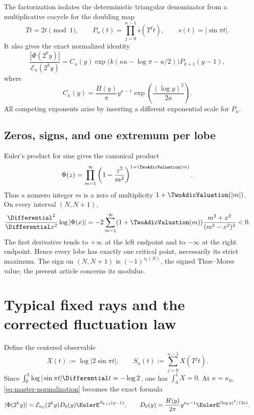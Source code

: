 \documentclass[11pt]{article}
\theoremstyle{definition}
\theoremstyle{remark}
\newcommand{\T}{T}
\newcommand{\Ecal}{\mathcal E}
\begin{document}
The factorization isolates the deterministic triangular denominator from a
multiplicative cocycle for the doubling map
\begin{equation}
 \T t=2t\pmod1,
 \qquad
 P_n(t)=\prod_{j=0}^{n-1}s(\T^jt),
 \qquad s(t)=|\sin\pi t|.
 \label{eq:doubling}
\end{equation}
It also gives the exact normalized identity
\begin{equation}
 \frac{|\Phi(2^ky)|}{\Ecal_\kappa(2^ky)}
 =C_\kappa(y)
 \exp\!\bigl(k(\kappa a-\log\pi-a/2)\bigr)P_{k+1}(y-1),
 \label{eq:master-normalization}
\end{equation}
where
\begin{equation}
 C_\kappa(y)=\frac{H(y)}{\pi}
 y^{\kappa-1}\exp\!\left(\frac{(\log y)^2}{2a}\right).
 \label{eq:Ckappa}
\end{equation}
All competing exponents arise by inserting a different exponential scale for
\(P_n\).

\subsection{Zeros, signs, and one extremum per lobe}

Euler's product for sine gives the canonical product
\begin{equation}
 \Phi(z)=\prod_{m=1}^{\infty}
 \left(1-\frac{z^2}{m^2}\right)^{1+\TwoAdicValuation(m)}.
 \label{eq:canonical-product}
\end{equation}
Thus a nonzero integer \(m\) is a zero of multiplicity
\(1+\TwoAdicValuation(|m|)\).  On every interval \((N,N+1)\),
\begin{equation}
 \frac{\Differential^2}{\Differential x^2}\log|\Phi(x)|
 =-2\sum_{m=1}^{\infty}(1+\TwoAdicValuation(m))
 \frac{m^2+x^2}{(m^2-x^2)^2}<0.
 \label{eq:strict-log-concavity}
\end{equation}
The first derivative tends to \(+\infty\) at the left endpoint and to
\(-\infty\) at the right endpoint.  Hence every lobe has exactly one critical
point, necessarily its strict maximum.  The sign on \((N,N+1)\) is
\((-1)^{s_2(N)}\), the signed Thue--Morse value; the present article concerns
its modulus.

\section{Typical fixed rays and the corrected fluctuation law}
\label{sec:typical}

Define the centered observable
\begin{equation}
 X(t):=\log|2\sin\pi t|,
 \qquad
 S_n(t):=\sum_{j=0}^{n-1}X(\T^jt).
 \label{eq:X-S}
\end{equation}
Since \(\int_0^1\log|\sin\pi t|\Differential t=-\log2\), one has
\(\int_0^1X=0\).  At \(\kappa=\kappa_0\),
\eqref{eq:master-normalization} becomes the exact formula
\begin{equation}
 |\Phi(2^ky)|
 =\Ecal_{\kappa_0}(2^ky)D_0(y)\EulerE^{S_{k+1}(y-1)},
 \qquad
 D_0(y)=\frac{H(y)}{2\pi}
 y^{\kappa_0-1}\EulerE^{(\log y)^2/(2a)}.
 \label{eq:typical-exact}
\end{equation}
\end{document}
